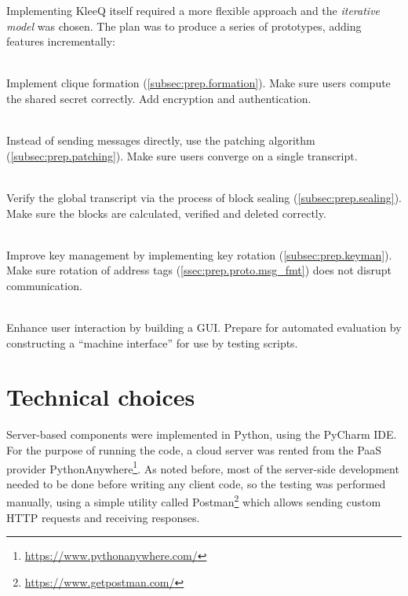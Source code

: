 \documentclass[a4paper, twoside, 12pt]{report}
\begin{document}
Implementing KleeQ itself required a more flexible approach and the \emph{iterative model} was chosen. The plan was to produce a series of prototypes, adding features incrementally:
\begin{description}[labelindent=0.5cm, leftmargin=1.3cm, rightmargin=0.5cm]
    \item[Prototype 1: Clique Formation]\hfill \\
        Implement clique formation (\cref{subsec:prep.formation}). Make sure users compute the shared secret correctly. Add encryption and authentication.
    \item[Prototype 2: Patching]\hfill \\
        Instead of sending messages directly, use the patching algorithm (\cref{subsec:prep.patching}). Make sure users converge on a single transcript.
    \item[Prototype 3: Sealing]\hfill \\
        Verify the global transcript via the process of block sealing (\cref{subsec:prep.sealing}). Make sure the blocks are calculated, verified and deleted correctly.
    \item[Prototype 4: Key Management]\hfill \\
        Improve key management by implementing key rotation (\cref{subsec:prep.keyman}). Make sure rotation of address tags (\cref{ssec:prep.proto.msg_fmt}) does not disrupt communication.
    \item[Prototype 5: Interface] \hfill \\
        Enhance user interaction by building a GUI. Prepare for automated evaluation by constructing a ``machine interface'' for use by testing scripts. 
\end{description}

\section{Technical choices}
\label{sec:choices}
Server-based components were implemented in Python, using the PyCharm IDE. For the purpose of running the code, a cloud server was rented from the PaaS provider PythonAnywhere\footnote{\url{https://www.pythonanywhere.com/}}. As noted before, most of the server-side development needed to be done before writing any client code, so the testing was performed manually, using a simple utility called Postman\footnote{\url{https://www.getpostman.com/}} which allows sending custom HTTP requests and receiving responses. \\
\end{document}
